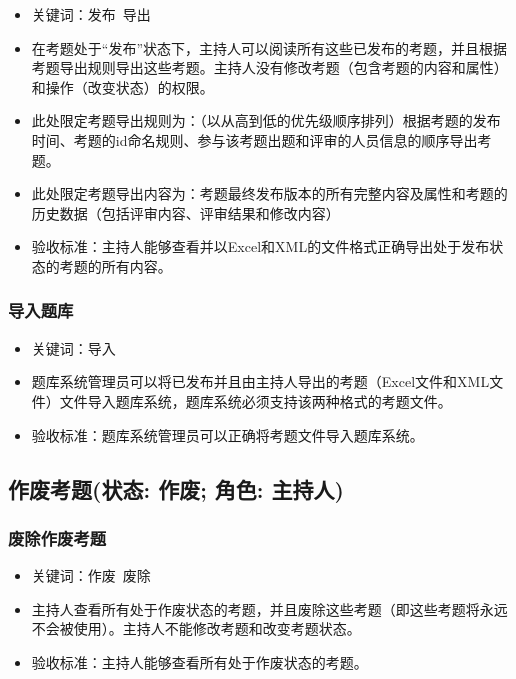 \documentclass[hyperref, a4paper]{ctexart}
\begin{document}
\begin{itemize}
\item
  关键词：发布~导出
\item
  在考题处于``发布''状态下，主持人可以阅读所有这些已发布的考题，并且根据考题导出规则导出这些考题。主持人没有修改考题（包含考题的内容和属性）和操作（改变状态）的权限。
\item
  此处限定考题导出规则为：（以从高到低的优先级顺序排列）根据考题的发布时间、考题的id命名规则、参与该考题出题和评审的人员信息的顺序导出考题。
\item
  此处限定考题导出内容为：考题最终发布版本的所有完整内容及属性和考题的历史数据（包括评审内容、评审结果和修改内容）
\item
  验收标准：主持人能够查看并以Excel和XML的文件格式正确导出处于发布状态的考题的所有内容。
\end{itemize}

\hypertarget{ux5bfcux5165ux9898ux5e93}{%
\subsubsection{导入题库}\label{ux5bfcux5165ux9898ux5e93}}

\begin{itemize}
\item
  关键词：导入
\item
  题库系统管理员可以将已发布并且由主持人导出的考题（Excel文件和XML文件）文件导入题库系统，题库系统必须支持该两种格式的考题文件。
\item
  验收标准：题库系统管理员可以正确将考题文件导入题库系统。
\end{itemize}

\hypertarget{ux4f5cux5e9fux8003ux9898ux72b6ux6001-ux4f5cux5e9f-ux89d2ux8272-ux4e3bux6301ux4eba}{%
\subsection{作废考题(状态: 作废; 角色:
主持人)}\label{ux4f5cux5e9fux8003ux9898ux72b6ux6001-ux4f5cux5e9f-ux89d2ux8272-ux4e3bux6301ux4eba}}

\hypertarget{ux5e9fux9664ux4f5cux5e9fux8003ux9898}{%
\subsubsection{废除作废考题}\label{ux5e9fux9664ux4f5cux5e9fux8003ux9898}}

\begin{itemize}
\item
  关键词：作废~废除
\item
  主持人查看所有处于作废状态的考题，并且废除这些考题（即这些考题将永远不会被使用）。主持人不能修改考题和改变考题状态。
\item
  验收标准：主持人能够查看所有处于作废状态的考题。
\end{itemize}
\end{document}
